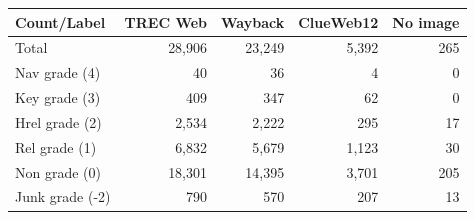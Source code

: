 \begin{table}[h]
  \label{tab:countsources}
  \begin{tabular}{ l  @{}r  r  r  r }
  \toprule
    Count/Label & TREC Web & Wayback & ClueWeb12 & \mbox{}\hspace*{-.15cm}No image\\
    \midrule
    Total & 28,906 & 23,249 & 5,392 & 265 \\
    Nav grade (4) & 40 & 36 & 4 & 0\\
    Key grade (3) & 409 & 347 & 62 & 0\\
    Hrel grade (2) & 2,534 & 2,222 & 295 & 17 \\
    Rel grade (1) & 6,832 & 5,679 & 1,123 & 30\\
    Non grade (0) & 18,301 & 14,395 & 3,701 & 205 \\
    Junk grade (-2) & 790 & 570 & 207 & 13\\
    \bottomrule
  \end{tabular} 
\end{table}


